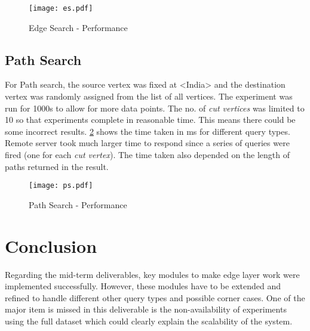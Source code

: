 \documentclass[conference]{IEEEtran}
\begin{document}
\begin{figure}[!t]
	\centering
	\texttt{[image: es.pdf]}
	\caption{Edge Search - Performance}
	\label{fig:edge_search}
\end{figure} 

\subsection{Path Search}

For Path search, the source vertex was fixed at <India> and the destination vertex was randomly assigned from the list of all vertices. The experiment was run for 1000s to allow for more data points. The no. of \emph{cut vertices} was limited to 10 so that experiments complete in reasonable time. This means there could be some incorrect results. \ref{fig:path_search} shows the time taken in ms for different query types. Remote server took much larger time to respond since a series of queries were fired (one for each \emph{cut vertex}). The time taken also depended on the length of paths returned in the result.


\begin{figure}[!t]
	\centering
	\texttt{[image: ps.pdf]}
	\caption{Path Search - Performance}
	\label{fig:path_search}
\end{figure}

\section{Conclusion}
Regarding the mid-term deliverables, key modules to make edge layer work were implemented successfully. However, these modules have to be extended and refined to handle different other query types and possible corner cases. One of the major item is missed in this deliverable is the non-availability of experiments using the full dataset which could clearly explain the scalability of the system.







\end{document}
